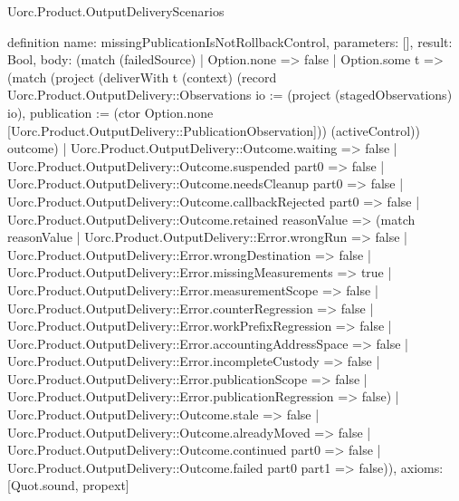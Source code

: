\begin{lexlean}{Uorc.Product.OutputDeliveryScenarios}
\begin{semanticmodule}
definition{
  name: missingPublicationIsNotRollbackControl,
  parameters: [],
  result: Bool,
  body: (match (failedSource)
    | Option.none => false
    | Option.some t => (match (project (deliverWith t (context) (record Uorc.Product.OutputDelivery::Observations {io := (project (stagedObservations) io), publication := (ctor Option.none [Uorc.Product.OutputDelivery::PublicationObservation])}) (activeControl)) outcome)
      | Uorc.Product.OutputDelivery::Outcome.waiting => false
      | Uorc.Product.OutputDelivery::Outcome.suspended part0 => false
      | Uorc.Product.OutputDelivery::Outcome.needsCleanup part0 => false
      | Uorc.Product.OutputDelivery::Outcome.callbackRejected part0 => false
      | Uorc.Product.OutputDelivery::Outcome.retained reasonValue => (match reasonValue
        | Uorc.Product.OutputDelivery::Error.wrongRun => false
        | Uorc.Product.OutputDelivery::Error.wrongDestination => false
        | Uorc.Product.OutputDelivery::Error.missingMeasurements => true
        | Uorc.Product.OutputDelivery::Error.measurementScope => false
        | Uorc.Product.OutputDelivery::Error.counterRegression => false
        | Uorc.Product.OutputDelivery::Error.workPrefixRegression => false
        | Uorc.Product.OutputDelivery::Error.accountingAddressSpace => false
        | Uorc.Product.OutputDelivery::Error.incompleteCustody => false
        | Uorc.Product.OutputDelivery::Error.publicationScope => false
        | Uorc.Product.OutputDelivery::Error.publicationRegression => false)
      | Uorc.Product.OutputDelivery::Outcome.stale => false
      | Uorc.Product.OutputDelivery::Outcome.alreadyMoved => false
      | Uorc.Product.OutputDelivery::Outcome.continued part0 => false
      | Uorc.Product.OutputDelivery::Outcome.failed part0 part1 => false)),
  axioms: [Quot.sound, propext]
}


\end{semanticmodule}
\end{lexlean}
